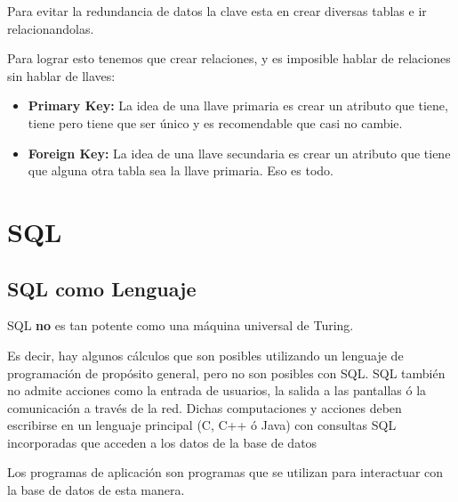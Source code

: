 \documentclass[12pt, fleqn]{report}                             %
\begin{document}
            Para evitar la redundancia de datos la clave esta en crear diversas tablas
            e ir relacionandolas.

            Para lograr esto tenemos que crear relaciones, y es imposible hablar de relaciones
            sin hablar de llaves:


            \begin{itemize}
                \item
                    \textbf{Primary Key:}
                    La idea de una llave primaria es crear un atributo que tiene, tiene pero
                    tiene que ser único y es recomendable que casi no cambie.


                \item
                    \textbf{Foreign Key:}
                    La idea de una llave secundaria es crear un atributo que tiene que alguna otra
                    tabla sea la llave primaria. Eso es todo.

            \end{itemize}


 










            
        





    \chapter{SQL}

        \clearpage
        \section{SQL como Lenguaje}
            
            SQL \textbf{no} es tan potente como una máquina universal de Turing.

            Es decir, hay algunos cálculos que son posibles utilizando un lenguaje de programación
            de propósito general, pero no son posibles con SQL.
            SQL también no admite acciones como la entrada de usuarios, la salida a las pantallas 
            ó la comunicación a través de la red.
            Dichas computaciones y acciones deben escribirse en un lenguaje principal (C, C++ ó Java)
            con consultas SQL incorporadas que acceden a los datos de la base de datos

            Los programas de aplicación son programas que se utilizan para interactuar con la base de datos de esta manera.
\end{document}
